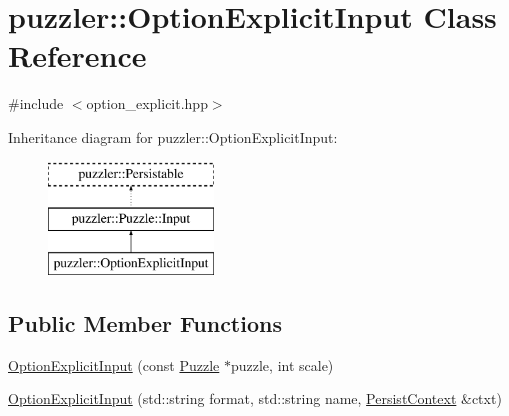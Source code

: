 \hypertarget{a00019}{}\section{puzzler\+:\+:Option\+Explicit\+Input Class Reference}
\label{a00019}


{\ttfamily \#include $<$option\+\_\+explicit.\+hpp$>$}

Inheritance diagram for puzzler\+:\+:Option\+Explicit\+Input\+:\begin{figure}[H]
\begin{center}
\leavevmode
\includegraphics[height=3.000000cm]{a00019}
\end{center}
\end{figure}
\subsection*{Public Member Functions}
\begin{DoxyCompactItemize}
\item 
\hyperlink{a00019_a497e9ab54a4c7a17a5e8176d7699d668}{Option\+Explicit\+Input} (const \hyperlink{a00026}{Puzzle} $\ast$puzzle, int scale)
\item 
\hyperlink{a00019_a4cc7cf9269051bf21b3b33903879f23a}{Option\+Explicit\+Input} (std\+::string format, std\+::string name, \hyperlink{a00025}{Persist\+Context} \&ctxt)
\end{DoxyCompactItemize}
